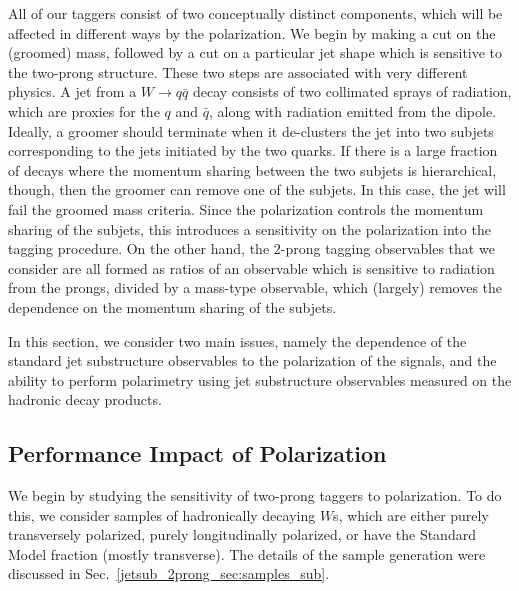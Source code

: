 \documentclass[11pt]{cernrep}
\begin{document}
All of our taggers consist of two conceptually distinct components, which will be affected in different ways by the polarization.
%
We begin by making a cut on the (groomed) mass, followed by a cut on a particular jet shape which is sensitive to the two-prong structure. These two steps are associated with very different physics. A jet from a $W\to q\bar q$ decay consists of two collimated sprays of radiation, which are proxies for the $q$ and $\bar q$, along with radiation emitted from the dipole.
%
Ideally, a groomer should terminate when it de-clusters the jet into two subjets corresponding to the jets initiated by the two quarks.
%
If there is a large fraction of decays where the momentum sharing between the two subjets is hierarchical, though, then the groomer can remove one of the subjets.
%
In this case, the jet will fail the groomed mass criteria.
%
Since the polarization controls the momentum sharing of the subjets, this introduces a sensitivity on the polarization into the tagging procedure.
%
On the other hand, the $2$-prong tagging observables that we consider are all formed as ratios of an observable which is sensitive to radiation from the prongs, divided by a mass-type observable, which (largely) removes the dependence on the momentum sharing of the subjets.

In this section, we consider two main issues, namely
the dependence of the standard jet substructure observables to the
polarization of the signals, and the ability to perform polarimetry
using jet substructure observables measured on the hadronic decay
products.

\subsection{Performance Impact of Polarization}\label{jetsub_2prong_sec:polar_robust}


We begin by studying the sensitivity of two-prong taggers to polarization.
%
To do this, we consider samples of hadronically decaying $W$s, which are either purely transversely polarized, purely longitudinally polarized, or have the Standard Model fraction (mostly transverse).
%
The details of the sample generation were discussed in Sec.~\ref{jetsub_2prong_sec:samples_sub}.
\end{document}
